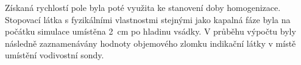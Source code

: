Získaná rychlostí pole byla poté využita ke stanovení doby homogenizace. Stopovací látka s fyzikálními vlastnostmi stejnými jako kapalná fáze byla na počátku simulace umístěna \SI{2}{\centi\meter} po hladinu vsádky. V průběhu výpočtu byly následně zaznamenávány hodnoty objemového zlomku indikační látky v místě umístění vodivostní sondy.



